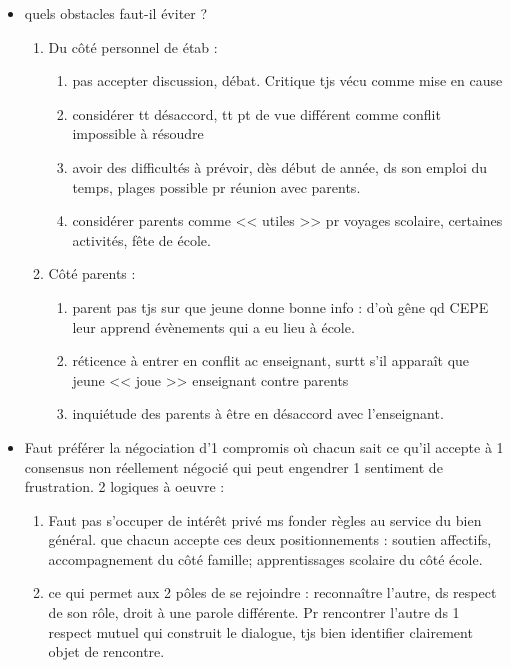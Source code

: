\documentclass[12pt]{report}
\begin{document}
\begin{itemize}
\begin{itemize}
\item quels obstacles faut-il éviter ?
\begin{enumerate}
\item Du côté personnel de étab : 
\begin{enumerate}
\item pas accepter discussion, débat. Critique tjs vécu comme mise en cause \\
\item considérer tt désaccord, tt pt de vue différent comme conflit impossible à résoudre \\
\item avoir des difficultés à prévoir, dès début de année, ds son emploi du temps, plages possible pr réunion avec parents.\\
\item considérer parents comme << utiles >> pr voyages scolaire, certaines activités, fête de école.
\end{enumerate}

\item Côté parents : 
\begin{enumerate}
\item parent pas tjs sur que jeune donne bonne info : d'où gêne qd CEPE leur apprend évènements qui a eu lieu à école.\\
\item réticence à entrer en conflit ac enseignant, surtt s'il apparaît que jeune << joue >> enseignant contre parents \\
\item inquiétude des parents à être en désaccord avec l'enseignant.\\
\end{enumerate}
\end{enumerate}

\item Faut préférer la négociation d'1 compromis où chacun sait ce qu'il accepte à 1 consensus non réellement négocié qui peut engendrer 1 sentiment de frustration. 2 logiques à oeuvre : 
\begin{enumerate}
\item Faut pas s'occuper de intérêt privé ms fonder règles au service du bien général. que chacun accepte ces deux positionnements : soutien affectifs, accompagnement du côté famille; apprentissages scolaire du côté école.\\
\item ce qui permet aux 2 pôles de se rejoindre : reconnaître l'autre, ds respect de son rôle, droit à une parole différente. Pr rencontrer l'autre ds  1 respect mutuel qui construit le dialogue, tjs bien identifier clairement objet de rencontre. \\
\end{enumerate}


\end{itemize}
\end{itemize}
\end{document}
